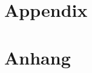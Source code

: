 

{\chapter{Appendix}}    %
{\chapter{Anhang}}      %
\label{chap:appendix}

\section{ }
\label{sec:app:}

